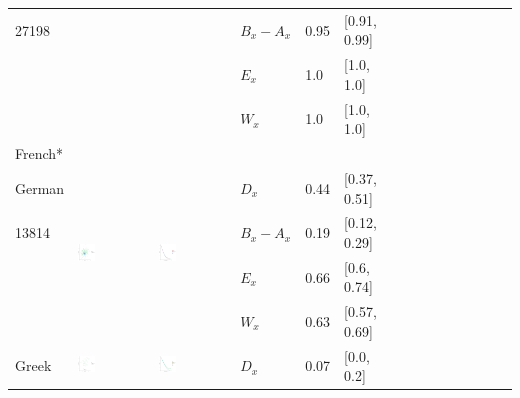 \documentclass[11pt,letterpaper]{article}
\begin{document}
\begin{longtable}{lllllllllllllll}
27198  &    &    &  $B_x-A_x$  &  0.95  &  [0.91, 0.99]  \\ 
  &    &    &  $E_x$  &  1.0  &  [1.0, 1.0]  \\ 
  &    &    &  $W_x$  &  1.0  &  [1.0, 1.0]  \\ [10.25ex] \hline
French*  &\\ [10.25ex] \hline
German  &  \multirow{4}{*}{\includegraphics[width=0.25\textwidth]{figures/German-entropy-memory.pdf}}  &  \multirow{4}{*}{\includegraphics[width=0.25\textwidth]{figures/German-listener-surprisal-memory.pdf}}  &  $D_x$  &  0.44  &  [0.37, 0.51]  \\ 
13814  &    &    &  $B_x-A_x$  &  0.19  &  [0.12, 0.29]  \\ 
  &    &    &  $E_x$  &  0.66  &  [0.6, 0.74]  \\ 
  &    &    &  $W_x$  &  0.63  &  [0.57, 0.69]  \\ [10.25ex] \hline
Greek  &  \multirow{4}{*}{\includegraphics[width=0.25\textwidth]{figures/Greek-entropy-memory.pdf}}  &  \multirow{4}{*}{\includegraphics[width=0.25\textwidth]{figures/Greek-listener-surprisal-memory.pdf}}  &  $D_x$  &  0.07  &  [0.0, 0.2]  \\ 

\end{longtable}
\end{document}
